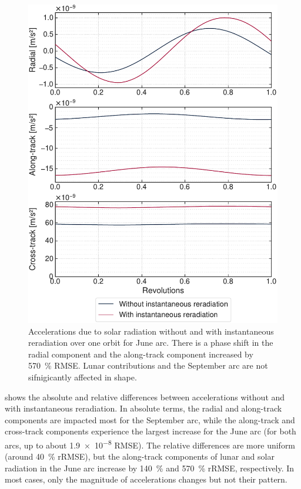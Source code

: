 \begin{figure}[t]
    \centering
    \includegraphics[width=\linewidth]{figures/plots/acc_reradiation_sun_jun.pdf}
    \caption{Accelerations due to solar radiation without and with instantaneous reradiation over one orbit for June arc. There is a phase shift in the radial component and the along-track component increased by \qty{570}{\percent} \gls{RMSE}. Lunar contributions and the September arc are not sifnigicantly affected in shape.}
    \label{fig:acc-reradiation}
\end{figure}

 shows the absolute and relative differences between accelerations without and with instantaneous reradiation. In absolute terms, the radial and along-track components are impacted most for the September arc, while the along-track and cross-track components experience the largest increase for the June arc (for both arcs, up to about \qty{1.9e-8}{\acc} \gls{RMSE}). The relative differences are more uniform (around \qty{40}{\percent} \gls{rRMSE}), but the along-track components of lunar and solar radiation in the June arc increase by \qty{140}{\percent} and \qty{570}{\percent} \gls{rRMSE}, respectively. In most cases, only the magnitude of accelerations changes but not their pattern.

